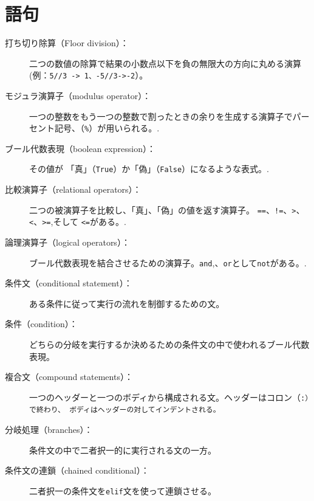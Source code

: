 \documentclass[a4j,12pt,makeidx]{jbook}
\begin{document}
\section{語句}
\begin{description}

\item[打ち切り除算（Floor division）：] 二つの数値の除算で結果の小数点以下を負の無限大の方向に丸める演算(例：{\verb"5//3 -> 1、-5//3->-2"}）。

\item[モジュラ演算子（modulus operator）：]一つの整数をもう一つの整数で割ったときの余りを生成する演算子でパーセント記号、（{\verb"%"}）が用いられる。.

\item[ブール代数表現（boolean expression）：]その値が 「真」（{\tt True}）か「偽」（{\tt False}）になるような表式。.

\item[比較演算子（relational operators）：]二つの被演算子を比較し、「真」、「偽」の値を返す演算子。 
{\tt ==}、{\tt !=}、{\tt >}、{\tt <}、{\tt >=},そして {\tt <=}がある。.

\item[論理演算子（logical operators）：]ブール代数表現を結合させるための演算子。{\tt and},、{\tt or}として{\tt not}がある。.

\item[条件文（conditional statement）：]ある条件に従って実行の流れを制御するための文。  

\item[条件（condition）：]どちらの分岐を実行するか決めるための条件文の中で使われるブール代数表現。 

\item[複合文（compound statements）：]一つのヘッダーと一つのボディから構成される文。ヘッダーはコロン（\tt :）で終わり、
ボディはヘッダーの対してインデントされる。

\item[分岐処理（branches）：]条件文の中で二者択一的に実行される文の一方。

\item[条件文の連鎖（chained conditional）：] 二者択一の条件文を{\tt elif}文を使って連鎖させる。


\end{description}
\end{document}
